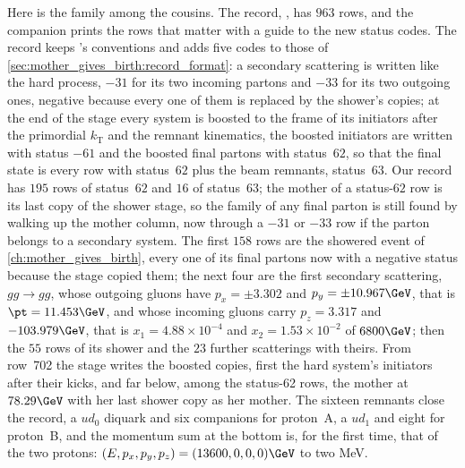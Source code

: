 Here is the family among the cousins. The record,
, has $963$ rows, and the companion prints
the rows that matter with a guide to the new status codes.
\label{sec:uninvited_cousins:record_format}
The record keeps \PYTHIA's conventions and adds five codes to those of
\cref{sec:mother_gives_birth:record_format}: a secondary scattering is
written like the hard process, $-31$ for its two incoming partons and $-33$
for its two outgoing ones, negative because every one of them is replaced
by the shower's copies; at the end of the stage every system is boosted to
the frame of its initiators after the primordial $k_{\mathrm{T}}$ and the
remnant kinematics, the boosted initiators are written with status $-61$
and the boosted final partons with status~$62$, so that the final state is
every row with status~$62$ plus the beam remnants, status~$63$. Our record
has $195$ rows of status~$62$ and $16$ of status~$63$; the mother of a
status-$62$ row is its last copy of the shower stage, so the family of any
final parton is still found by walking up the mother column, now through a
$-31$ or $-33$ row if the parton belongs to a secondary system. The first
$158$ rows are the showered event of \cref{ch:mother_gives_birth}, every
one of its final partons now with a negative status because the stage
copied them; the next four are the first secondary scattering, $gg\to gg$,
whose outgoing gluons have $p_x=\pm3.302$ and $p_y=\pm10.967\GeV$, that is
$\pt=11.453\GeV$, and whose incoming gluons carry $p_z=3.317$ and
$-103.979\GeV$, that is $x_1=4.88\times10^{-4}$ and $x_2=1.53\times10^{-2}$
of $6800\GeV$; then the $55$ rows of its shower and the $23$ further
scatterings with theirs. From row~702 the stage writes the boosted copies,
first the hard system's initiators after their kicks, and far below, among
the status-62 rows, the mother at $78.29\GeV$ with her last shower copy as
her mother. The sixteen remnants close the record, a $ud_0$ diquark and six
companions for proton~A, a $ud_1$ and eight for proton~B, and the momentum
sum at the bottom is, for the first time, that of the two protons:
$(E,p_x,p_y,p_z)=(13600,0,0,0)\GeV$ to two MeV.

